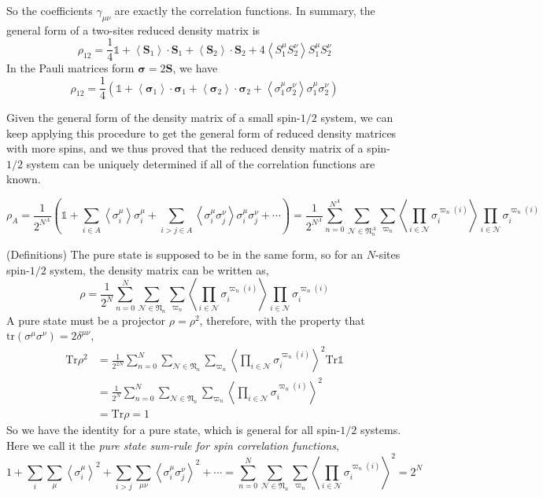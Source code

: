 \documentclass[12font]{article}
\theoremstyle{definition}
\numberwithin{equation}{section}
\newcommand{\anglelr}[1]{\left\langle #1 \right\rangle}
\newcommand{\lr}[1]{\left(  #1  \right)}
\newcommand{\mrm}[1]{\mathrm{#1}}
\newcommand{\bo}[1]{\mathbf{#1}}
\newcommand{\bog}[1]{\boldsymbol{#1}}
\newcommand{\alert}[1]{{\color{red}#1}}
\newcommand{\Tr}{\mrm{Tr}}
\begin{document}
So the coefficients $\gamma_{\mu\nu}$ are exactly the correlation functions. In summary, the general form of a two-sites reduced density matrix is 
\[
  \rho_{12} = \frac{1}{4}\mathds{1} + \anglelr{\bo{S}_1}\cdot \bo{S}_1 + \anglelr{\bo{S}_2}\cdot \bo{S}_2 + 4\anglelr{S^\mu_1 S^\nu_2} S_1^{\mu}S_2^{\nu}
\]
In the Pauli matrices form $\bog{\sigma} = 2\bo{S}$, we have
\begin{equation}\label{GeneralTwoSitesDM.e}
\rho_{12} = \frac{1}{4}\lr{\mathds{1} + \anglelr{\bog{\sigma}_1}\cdot \bog{\sigma}_1 + \anglelr{\bog{\sigma}_2}\cdot \bog{\sigma}_2 + \anglelr{\sigma^\mu_1 \sigma^\nu_2} \sigma_1^{\mu}\sigma_2^{\nu}}
\end{equation}


Given the general form of the density matrix of a small spin-$1/2$ system, we can keep applying this procedure to get the general form of reduced density matrices with more spins, and we thus proved that the reduced density matrix of a spin-$1/2$ system can be uniquely determined if all of the correlation functions are known. 

\[
\rho_A = \frac{1}{2^{N^A}}\lr{\mathds{1} + \sum_{i\in A}\anglelr{\sigma_i^\mu} \sigma_i^\mu + \sum_{i>j\in A}\anglelr{\sigma^\mu_i\sigma^\nu_j}\sigma^\mu_i\sigma^\nu_j + \cdots} = \frac{1}{2^{N^A}}\sum_{n=0}^{N^A} \sum_{\mathcal{N}\in \mathfrak{N}_n^A} \sum_{\varpi_n} \anglelr{\prod_{i\in\mathcal{N}}\sigma^{\varpi_n(i)}_i} \prod_{i\in\mathcal{N}}\sigma^{\varpi_n(i)}_i
\]

\alert{(Definitions)} The pure state is supposed to be in the same form, so for an $N$-sites spin-$1/2$ system, the density matrix can be written as,
\begin{equation}\label{GeneralDensityMatrix.e}
  \rho = \frac{1}{2^{N}}\sum_{n=0}^{N} \sum_{\mathcal{N}\in \mathfrak{N}_n} \sum_{\varpi_n} \anglelr{\prod_{i\in\mathcal{N}}\sigma^{\varpi_n(i)}_i} \prod_{i\in\mathcal{N}}\sigma^{\varpi_n(i)}_i
\end{equation}
A pure state must be a projector $\rho = \rho^2$, therefore, with the property that $\mrm{tr}\lr{\sigma^\mu\sigma^\nu} = 2\delta^{\mu\nu}$,
\begin{align*}
  \Tr\rho^2 
  &= \frac{1}{2^{2N}}\sum_{n=0}^{N} \sum_{\mathcal{N}\in \mathfrak{N}_n} \sum_{\varpi_n} \anglelr{\prod_{i\in\mathcal{N}}\sigma^{\varpi_n(i)}_i}^2\Tr\mathds{1} \\
  &= \frac{1}{2^{N}}\sum_{n=0}^{N} \sum_{\mathcal{N}\in \mathfrak{N}_n} \sum_{\varpi_n} \anglelr{\prod_{i\in\mathcal{N}}\sigma^{\varpi_n(i)}_i}^2 \\
  &= \Tr\rho = 1
\end{align*}
So we have the identity for a pure state, which is general for all spin-$1/2$ systems. Here we call it the \emph{pure state sum-rule for spin correlation functions},
\begin{equation}\label{PureStateConditionGeneral.e}
  1 + \sum_{i}\sum_{\mu}\anglelr{\sigma_i^\mu}^2 + \sum_{i>j}\sum_{\mu\nu}\anglelr{\sigma_i^\mu\sigma_j^\nu}^2 + \cdots  = \sum_{n=0}^{N} \sum_{\mathcal{N}\in \mathfrak{N}_n} \sum_{\varpi_n} \anglelr{\prod_{i\in\mathcal{N}}\sigma^{\varpi_n(i)}_i}^2 = 2^N
\end{equation}
\end{document}
